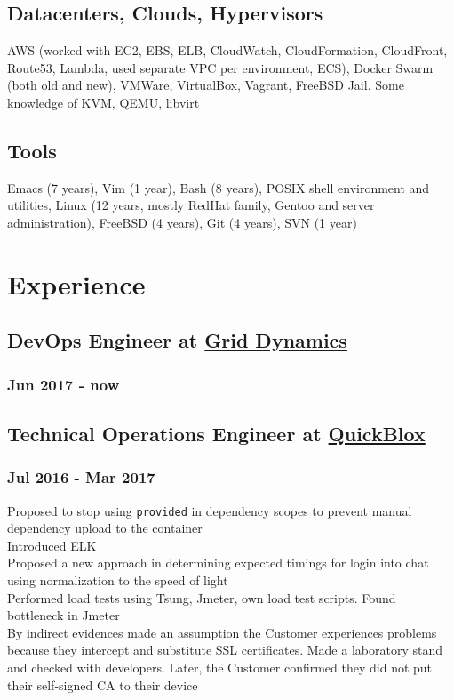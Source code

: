\documentclass[letterpaper]{article}
\begin{document}
\subsection{Datacenters, Clouds, Hypervisors}
\label{sec-1-7}
AWS (worked with EC2, EBS, ELB, CloudWatch, CloudFormation, CloudFront, Route53, Lambda, used separate VPC per environment, ECS),
Docker Swarm (both old and new),
VMWare,
VirtualBox,
Vagrant,
FreeBSD Jail.
Some knowledge of KVM, QEMU, libvirt
\subsection{Tools}
\label{sec-1-8}
Emacs (7 years),
Vim (1 year),
Bash (8 years),
POSIX shell environment and utilities,
Linux (12 years, mostly RedHat family, Gentoo and server administration),
FreeBSD (4 years),
Git (4 years),
SVN (1 year)
\section{Experience}
\label{sec-2}
\subsection{DevOps Engineer at \href{https://www.griddynamics.com/}{Grid Dynamics}}
\label{sec-2-1}
\subsubsection{Jun 2017 - now}
\label{sec-2-1-1}
\subsection{Technical Operations Engineer at \href{https://quickblox.com}{QuickBlox}}
\label{sec-2-2}
\subsubsection{Jul 2016 - Mar 2017}
\label{sec-2-2-1}
Proposed to stop using \verb~provided~ in dependency scopes to prevent manual dependency upload to the container\\
Introduced ELK\\
Proposed a new approach in determining expected timings for login into chat using normalization to the speed of light\\
Performed load tests using Tsung, Jmeter, own load test scripts. Found bottleneck in Jmeter\\
By indirect evidences made an assumption the Customer experiences problems because they intercept and substitute SSL certificates. Made a laboratory stand and checked with developers. Later, the Customer confirmed they did not put their self-signed CA to their device\\
\end{document}
